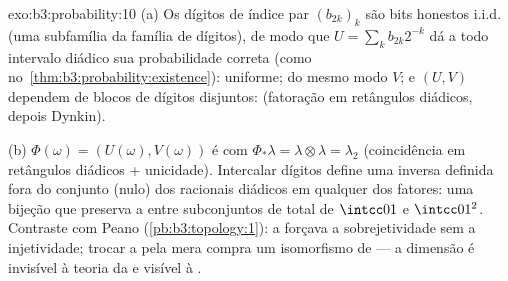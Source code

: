 \begin{solution}{exo:b3:probability:10}
(a) Os dígitos de índice par $(b_{2k})_k$ são bits honestos i.i.d.
(uma subfamília da família  de dígitos), de modo que $U =
\sum_kb_{2k}2^{-k}$ dá a todo intervalo diádico sua
probabilidade correta (como no~\cref{thm:b3:probability:existence}): uniforme; do mesmo modo $V$;
e $(U, V)$ dependem de blocos de dígitos disjuntos: 
(fatoração em retângulos diádicos, depois Dynkin).

(b) $\Phi(\omega) = (U(\omega), V(\omega))$ é 
com $\Phi_*\lambda = \lambda\otimes\lambda = \lambda_2$
(coincidência em retângulos diádicos + unicidade). Intercalar
dígitos define uma inversa definida fora do conjunto (nulo) dos
racionais diádicos em qualquer dos fatores: uma bijeção que
preserva a  entre subconjuntos de  total de $\intcc01$ e
$\intcc01^2$. Contraste com Peano
(\cref{pb:b3:topology:1}): a  forçava a sobrejetividade
sem a injetividade; trocar a  pela mera
 compra um isomorfismo de  --- a dimensão é
invisível à teoria da  e visível à .
\end{solution}

